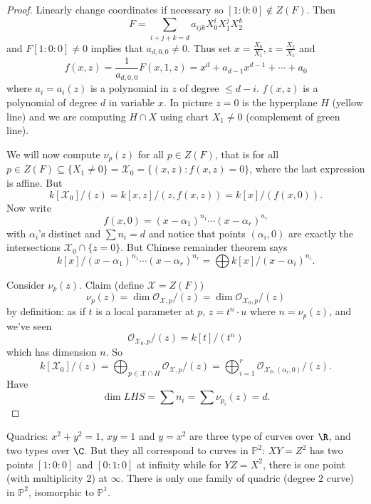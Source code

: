 \documentclass[a4paper]{article}
\renewcommand*{\P}{\mathbb{P}}
\begin{document}
\begin{proof}
  Linearly change coordinates if necessary so \([1: 0 : 0] \notin Z(F)\). Then
  \[
    F = \sum_{i + j + k = d} a_{ijk} X_0^i X_1^j X_2^k
  \]
  and \(F[1: 0: 0] \neq 0\) implies that \(a_{d, 0, 0} \neq 0\). Thus set \(x = \frac{X_0}{X_1}, z = \frac{X_2}{X_1}\) and
  \[
    f(x, z) = \frac{1}{a_{d, 0, 0}} F(x, 1, z)
    = x^d + a_{d - 1} x^{d - 1} + \cdots + a_0
  \]
  where \(a_i = a_i(z)\) is a polynomial in \(z\) of degree \(\leq d - i\). \(f(x, z)\) is a polynomial of degree \(d\) in variable \(x\). In picture \(z = 0\) is the hyperplane \(H\) (yellow line) and we are computing \(H \cap X\) using chart \(X_1 \neq 0\) (complement of green line).

  We will now compute \(\nu_p(z)\) for all \(p \in Z(F)\), that is for all \(p \in Z(F) \subseteq \{X_1 \neq 0\} = \mathcal X_0 = \{(x, z): f(x, z) = 0\}\), where the last expression is affine. But
  \[
    k[\mathcal X_0]/(z)
    = k[x, z]/(z, f(x, z))
    = k[x]/(f(x, 0)).
  \]
  Now write
  \[
    f(x, 0) = (x - \alpha_1)^{n_1} \cdots (x - \alpha_r)^{n_r}
  \]
  with \(\alpha_i\)'s distinct and \(\sum n_i = d\) and notice that points \((\alpha_i, 0)\) are exactly the intersections \(\mathcal X_0 \cap \{z = 0\}\). But Chinese remainder theorem says
  \[
    k[x]/(x - \alpha_1)^{n_1} \cdots (x - \alpha_r)^{n_r} = \bigoplus k[x]/(x - \alpha_i)^{n_i}.
  \]

  Consider \(\nu_p(z)\). Claim (define \(\mathcal X = Z(F)\))
  \[
    \nu_p(z) = \dim \mathcal O_{\mathcal X, p}/(z) = \dim \mathcal O_{\mathcal X_0, p} /(z)
  \]
  by definition: as if \(t\) is a local parameter at \(p\), \(z = t^n \cdot u\) where \(n = \nu_p(z)\), and we've seen
  \[
    \mathcal O_{\mathcal X_0, p}/(z) = k[t]/(t^n)
  \]
  which has dimension \(n\). So
  \[
    k[\mathcal X_0]/(z) = \bigoplus_{p \in \mathcal X \cap H} \mathcal O_{\mathcal X, p}/(z) = \bigoplus_{i = 1}^r \mathcal O_{\mathcal X_0, (\alpha_i, 0)} /(z).
  \]
  Have
  \[
    \dim LHS = \sum n_i = \sum \nu_{p_i}(z) = d.
  \]
\end{proof}

\begin{remark}
  Quadrics: \(x^2 + y^2 = 1\), \(xy = 1\) and \(y = x^2\) are three type of curves over \(\R\), and two types over \(\C\). But they all correspond to curves in \(\P^2\): \(XY = Z^2\) has two points \([1:0:0]\) and \([0:1:0]\) at infinity while for \(YZ = X^2\), there is one point (with multiplicity 2) at \(\infty\). There is only one family of quadric (degree \(2\) curve) in \(\P^2\), isomorphic to \(\P^1\).
\end{remark}
\end{document}
